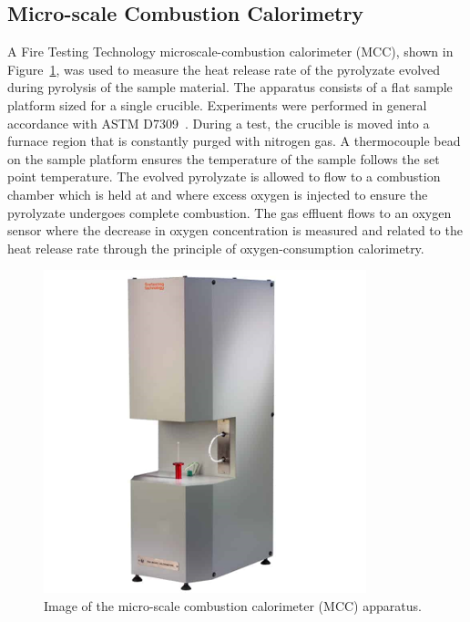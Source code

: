 \documentclass[12pt,oneside]{book}
\begin{document}
\subsection{Micro-scale Combustion Calorimetry}
\label{sec:sta}

A Fire Testing Technology microscale-combustion calorimeter (MCC), shown in Figure~\ref{fig:MCC_apparatus}, was used to measure the heat release rate of the pyrolyzate evolved during pyrolysis of the sample material. The apparatus consists of a flat sample platform sized for a single crucible. Experiments were performed in general accordance with ASTM D7309~\cite{ASTM_D7309}. During a test, the crucible is moved into a furnace region that is constantly purged with nitrogen gas. A thermocouple bead on the sample platform ensures the temperature of the sample follows the set point temperature. The evolved pyrolyzate is allowed to flow to a combustion chamber which is held at  and where excess oxygen is injected to ensure the pyrolyzate undergoes complete combustion. The gas effluent flows to an oxygen sensor where the decrease in oxygen concentration is measured and related to the heat release rate through the principle of oxygen-consumption calorimetry. 

\begin{figure}[!ht]
\centering
\includegraphics[width=.75\columnwidth]{Figures/MCC.png}
\caption[Image of the Micro-Scale Combustion Calorimeter (MCC) Apparatus]{Image of the micro-scale combustion calorimeter (MCC) apparatus.}
\label{fig:MCC_apparatus}
\end{figure}
\end{document}
